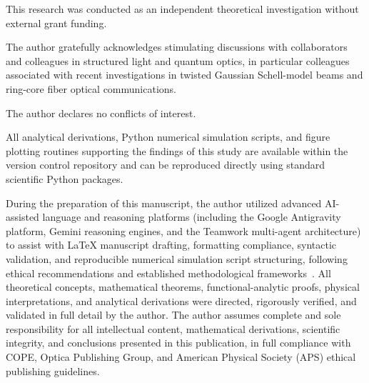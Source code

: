 \documentclass{optica-article}
\begin{document}
\begin{backmatter}
This research was conducted as an independent theoretical investigation without external grant funding.

The author gratefully acknowledges stimulating discussions with collaborators and colleagues in structured light and quantum optics, in particular colleagues associated with recent investigations in twisted Gaussian Schell-model beams and ring-core fiber optical communications.

The author declares no conflicts of interest.

All analytical derivations, Python numerical simulation scripts, and figure plotting routines supporting the findings of this study are available within the version control repository and can be reproduced directly using standard scientific Python packages.

During the preparation of this manuscript, the author utilized advanced AI-assisted language and reasoning platforms (including the Google Antigravity platform, Gemini reasoning engines, and the Teamwork multi-agent architecture) to assist with LaTeX manuscript drafting, formatting compliance, syntactic validation, and reproducible numerical simulation script structuring, following ethical recommendations and established methodological frameworks~\cite{Jauhiainen2026,Zhu2026PaperBanana,Haber2025,OToole2024,VillaescusaNavarro2026,Chandra2026TheoPhysEval,Kacena2024}. All theoretical concepts, mathematical theorems, functional-analytic proofs, physical interpretations, and analytical derivations were directed, rigorously verified, and validated in full detail by the author. The author assumes complete and sole responsibility for all intellectual content, mathematical derivations, scientific integrity, and conclusions presented in this publication, in full compliance with COPE, Optica Publishing Group, and American Physical Society (APS) ethical publishing guidelines.
\end{backmatter}


\end{document}
